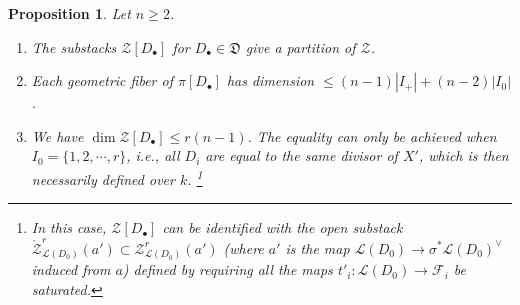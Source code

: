 \documentclass[reqno]{amsart}
\numberwithin{equation}{section}
\newcommand{\bu}{\bullet}
\newcommand\cF{\mathcal{F}}
\newcommand\cL{\mathcal{L}}
\newcommand\cZ{\mathcal{Z}}
\newcommand\frD{\mathfrak{D}}
\newtheorem{prop}[thm]{Proposition}
\theoremstyle{remark}
\numberwithin{equation}{section}
\begin{document}
\begin{prop}\label{p:ShM dim} Let $n \geq 2$. \hfill
\begin{enumerate}	
\item The substacks $\cZ[D_{\bu}]$ for $D_{\bu}\in \frD$ give a partition of $\cZ$.
\item Each geometric fiber of $\pi[D_{\bu}]$ has dimension $\le (n-1)|I_{+}|+(n-2)|I_{0}|$.
\item We have $\dim \cZ[D_{\bu}]\le r(n-1)$. The equality can only be achieved when  $I_{0}=\{1,2,\cdots, r\}$, i.e., all $D_{i}$ are equal to the same divisor of $X'$, which is then necessarily defined over $k$. \footnote{In this case, $\cZ[D_{\bu}]$ can be identified with the open substack $\mathring{\cZ}^{r}_{\cL(D_{0})}(a')\subset \cZ^{r}_{\cL(D_{0})}(a')$ (where $a'$ is the map $\cL(D_{0}) \rightarrow \sigma^* \cL(D_{0})^{\vee}$ induced from $a$) defined by requiring all the maps $t'_{i}: \cL(D_{0})\to \cF_{i}$ be saturated.}
\end{enumerate}
\end{prop}
\end{document}
